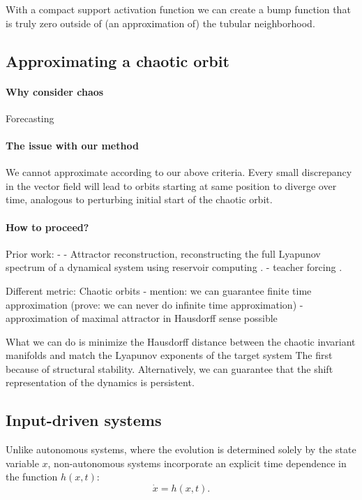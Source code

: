 \documentclass{article}
\newcounter{ct}
\begin{document}
With a compact support activation function we can create a bump function that is truly zero outside of (an approximation of) the tubular neighborhood.


\subsection{Approximating a chaotic orbit}\label{sec:chaos} 
 \citep{pathak2017using}
\paragraph{Why consider chaos} 
Forecasting
 \citep{jaeger2004harnessing}
 \citep{fan2020long}
 \citep{vlachas2020backpropagation}
 \citep{grigoryeva2024forecasting}

\paragraph{The issue with our method} 
We cannot approximate according to our above criteria.
Every small discrepancy in the vector field will lead to orbits starting at same position to diverge over time, analogous to perturbing initial start of the chaotic orbit.


\paragraph{How to proceed?}
Prior work:
-  \citep{dellnitz1999approximation}
- Attractor reconstruction, reconstructing the full Lyapunov spectrum of a dynamical system using reservoir computing  \citep{hart2024attractor}.
- teacher forcing  \citep{hess2023teacherforcing}.

Different metric: Chaotic orbits
- mention: we can guarantee finite time approximation (prove: we can never do infinite time approximation)
- approximation of maximal attractor in Hausdorff sense possible  \citep{hess2023teacherforcing}

What we can do is minimize the Hausdorff distance between the chaotic invariant manifolds and match the Lyapunov exponents of the target system
The first because of structural stability.
%
Alternatively, we can guarantee that the shift representation of the dynamics is persistent.



\subsection{Input-driven systems}\label{sec:input_driven_app} 
Unlike autonomous systems, where the evolution is determined solely by the state variable $x$, non-autonomous systems incorporate an explicit time dependence in the function $h(x,t)$:
\begin{equation}
\dot x = h(x,t).
\end{equation}
\end{document}
